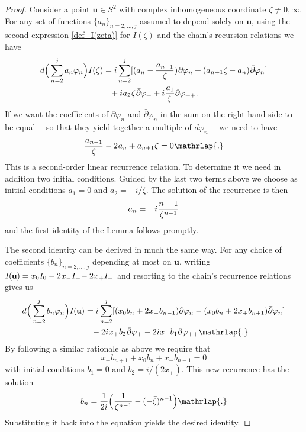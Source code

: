 \documentclass[11pt]{amsart}
\theoremstyle{remark}
\theoremstyle{remark}
\theoremstyle{definition}
\theoremstyle{definition}
\theoremstyle{definition}
\newcommand{\IU}{I\nhp(\nhp\mathbf{u}\hspace{-0.2pt})} %
\newcommand{\0}{{\scriptstyle 0'}} %
\newcommand{\1}{{\scriptstyle 1'}}
\newcommand{\hp}{\hspace{0.5pt}} %
\newcommand{\nhp}{\hspace{-0.5pt}} %
\begin{document}
\begin{proof} 

Consider a point $\mathbf{u} \in S^2$ with complex inhomogeneous coordinate $\zeta \neq 0,\infty$. For any set of functions $\{a_n \}_{n = 2, \dots, j}$ assumed to depend solely on $\mathbf{u}$, using the second expression \eqref{def_I(zeta)} for $I(\zeta)$ and the chain's recursion relations we have 
{\allowdisplaybreaks
\begin{align}
d\Big(\sum_{n=2}^j a_n \varphi_n \Big) I(\zeta) & = 
i \sum_{n=2}^j [ (a_n - \frac{a_{n-1}}{\zeta}) \hp \partial \varphi_n + (a_{n+1}\zeta - a_n) \hp \bar{\partial}\varphi_n ] \\
& \phantom{=} + i \hp a_2 \hp \zeta \hp \bar{\partial} \varphi_+ + i \hp \frac{a_1}{\zeta \,} \partial \varphi_{++}  \rlap{.} \nonumber
\end{align}
}%
If we want the coefficients of $\partial\varphi_n$ and $\bar{\partial}\varphi_n$ in the sum on the right-hand side to be equal\,---\,so that they yield together a multiple of $d\varphi_n$\,---\,we need to have
\begin{equation}
\frac{a_{n-1}}{\zeta} - 2 \hp a_n + a_{n+1}\zeta = 0 \mathrlap{.}
\end{equation}
This is a second-order linear recurrence relation. To determine it we need in addition two initial conditions. Guided by the last two terms above we choose as initial conditions $a_1 = 0$ and $a_2 = - i/ \zeta$. The solution of the recurrence is then
\begin{equation}
a_n = - i \hp \frac{n-1}{\zeta^{n-1}}
\end{equation}
and the first identity of the Lemma follows promptly. 

The second identity can be derived in much the same way. For any choice of coefficients $\{b_n\}_{n = 2,\dots,j}$ depending at most on $\mathbf{u}$, writing $\IU = x_0 I_0 - 2 \hp x_-I_+ \!- 2 \hp x_+I_-$ and resorting to the chain's recurrence relations gives us
{\allowdisplaybreaks
\begin{align}
d\Big(\sum_{n=2}^j b_n \varphi_n \Big) \IU & = i \sum_{n=2}^j [(x_0b_n + 2x_-b_{n-1}) \partial\varphi_n - (x_0b_n + 2x_+b_{n+1})\bar{\partial}\varphi_n] \\
& \phantom{=} - 2i \hp x_+ b_2 \hp \bar{\partial} \varphi_+ - 2i \hp x_-b_1 \partial\varphi_{++} \mathrlap{.} \nonumber
\end{align}
}%
By following a similar rationale as above we require that
\begin{equation}
x_+ b_{n+1} + x_0 b_n + x_- b_{n-1} = 0
\end{equation}
with initial conditions $b_1 = 0$ and $b_2 = i/ (2 x_+)$. This new recurrence has the solution 
\begin{equation}
b_n = \frac{1}{2i} \Big(\hp \frac{1}{\zeta^{n-1}} - (-\bar{\zeta})^{n-1} \Big) \mathrlap{.}
\end{equation}
Substituting it back into the equation yields the desired identity.
\end{proof} 
\end{document}

